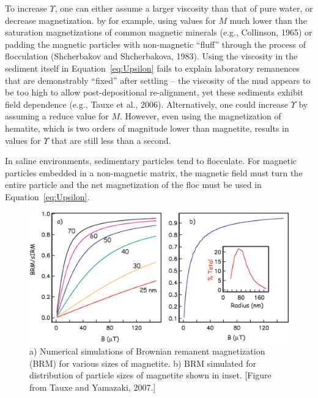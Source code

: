 To increase $\Upsilon$, one can either assume a larger viscosity than that of pure water, or decrease magnetization. by for example, using values   for $M$ much lower than the saturation magnetizations of common magnetic minerals (e.g.,  \nocite{collinson65}
Collinson, 1965) or padding the magnetic particles with non-magnetic ``fluff'' through the process of flocculation 
(Shcherbakov and Shcherbakova, 1983).    \nocite{shcherbakov83}
Using the viscosity in the sediment itself  in Equation~\ref{eq:Upsilon} fails to explain laboratory remanences that are demonstrably ``fixed'' after settling -- the viscosity of the mud appears to be too high to allow post-depositional  re-alignment, yet these sediments exhibit field dependence (e.g., Tauxe et al., 2006).   \nocite{tauxe06}
Alternatively, one could increase  $\Upsilon$ by  assuming a reduce value for $M$.  However, even using the magnetization of hematite, which is two orders of magnitude lower than magnetite, results in values for $\Upsilon$ that are still less than a second.  

  In  saline environments, sedimentary particles tend to flocculate.    For magnetic particles embedded in a non-magnetic matrix,   the magnetic field must turn the entire particle and the net magnetization of the floc  must be used in Equation~\ref{eq:Upsilon}.    



\begin{figure}[htb]
\centering  \includegraphics[width=14 cm]{EPSfiles/brownian.eps}
\caption{a) Numerical simulations of Brownian remanent magnetization (BRM) for various sizes of magnetite.  b) BRM simulated for distribution of particle sizes of magnetite shown in inset.  [Figure from Tauxe and Yamazaki, 2007.]}
\label{fig:brownian}
\end{figure}

